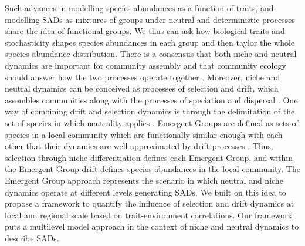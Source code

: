 \documentclass[12pt]{article}
\begin{document}
Such advances in modelling species abundances as a function of traits, and modelling SADs as mixtures of groups under neutral and deterministic processes share the idea of functional groups. We thus can ask how biological traits and stochasticity shapes species abundances in each group and then taylor the whole species abundance distribution.
There is a consensus that both niche and neutral dynamics are important for community assembly \citep{Vellend2014} and that community ecology should answer how the two processes operate together \citep{Gravel2006, Herault2007, Ovaskainen2017}.
Moreover, niche and neutral dynamics can be conceived as processes of selection and drift, which assembles communities along with the processes of speciation and dispersal \citep{Vellend2014}.
One way of combining drift and selection dynamics is through the delimitation 
of the set of species in which neutrality applies \citep{Tilman2004, Scheffer2006, Herault2007, Holt2007}. Emergent Groups are defined as sets of species in a local community which are functionally similar enough with each other that their dynamics are well approximated by drift processes \citep{Herault2007}. Thus, selection through niche differentiation defines each Emergent Group, and within the Emergent Group drift defines species abundances in the local community. The Emergent Group approach represents the scenario in which neutral and niche dynamics operate at different levels generating SADs. %
We built on this idea to
propose a framework to quantify the influence of selection and drift dynamics at local and regional scale based on trait-environment correlations. Our framework puts a multilevel model approach \citep{Pollock2012, Jamil2013, Jamil2013a, Miller2019, TerBraak2019} in the context of niche and neutral dynamics to describe SADs. 
\end{document}
